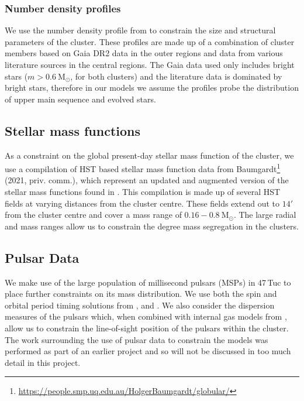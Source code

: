 \subsubsection{Number density profiles}
We use the number density profile from \citet{DeBoer2019} to constrain the size and structural
parameters of the cluster. These profiles are made up of a combination of cluster members based on
Gaia DR2 data in the outer regions and data from various literature sources in the central regions.
The Gaia data used only includes bright stars ($m > 0.6 \ \mathrm{M}_\odot$, for both clusters) and
the literature data is dominated by bright stars, therefore in our models we assume the profiles
probe the distribution of upper main sequence and evolved stars.

\subsection{Stellar mass functions}

As a constraint on the global present-day stellar mass function of the cluster, we use a compilation
of HST based stellar mass function data from
Baumgardt\footnote{\url{https://people.smp.uq.edu.au/HolgerBaumgardt/globular/}} (2021, priv.
comm.), which represent an updated and augmented version of the stellar mass functions found in
\citet{Sollima2017}. This compilation is made up of several HST fields at varying distances from the
cluster centre. These fields extend out to $14 '$ from the cluster centre and cover a mass range of
$0.16 - 0.8 \ \mathrm{M}_\odot$. The large radial and mass ranges allow us to constrain the degree
mass segregation in the clusters.

\subsection{Pulsar Data}

We make use of the large population of millisecond pulsars (MSPs) in 47\,Tuc to place further
constraints on its mass distribution. We use both the spin and orbital period timing solutions from
\citet{Freire2017}, \citet{Ridolfi2016} and \citet{Freire2018}. We also consider the dispersion
measures of the pulsars which, when combined with internal gas models from \citet{Abbate2018}, allow
us to constrain the line-of-sight position of the pulsars within the cluster. The work surrounding
the use of pulsar data to constrain the models was performed as part of an earlier project and so
will not be discussed in too much detail in this project.



